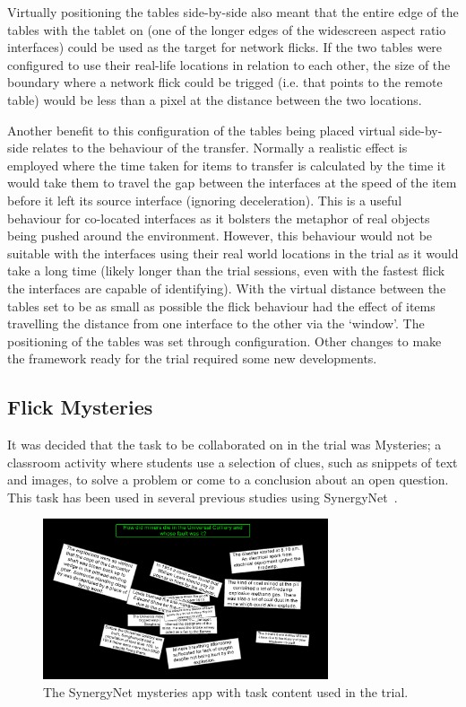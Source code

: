 \documentclass[a4paper,11pt]{article}
\begin{document}
Virtually positioning the tables side-by-side also meant that the entire edge of the tables with the tablet on (one of the longer edges of the widescreen aspect ratio interfaces) could be used as the target for network flicks.
If the two tables were configured to use their real-life locations in relation to each other, the size of the boundary where a network flick could be trigged (i.e. that points to the remote table) would be less than a pixel at the distance between the two locations.

Another benefit to this configuration of the tables being placed virtual side-by-side relates to the behaviour of the transfer.
Normally a realistic effect is employed where the time taken for items to transfer is calculated by the time it would take them to travel the gap between the interfaces at the speed of the item before it left its source interface (ignoring deceleration).
This is a useful behaviour for co-located interfaces as it bolsters the metaphor of real objects being pushed around the environment.
However, this behaviour would not be suitable with the interfaces using their real world locations in the trial as it would take a long time (likely longer than the trial sessions, even with the fastest flick the interfaces are capable of identifying).
With the virtual distance between the tables set to be as small as possible the flick behaviour had the effect of items travelling the distance from one interface to the other via the `window'.
The positioning of the tables was set through configuration.
Other changes to make the framework ready for the trial required some new developments.

\subsection{Flick Mysteries}

It was decided that the task to be collaborated on in the trial was Mysteries; a classroom activity where students use a selection of clues, such as snippets of text and images, to solve a problem or come to a conclusion about an open question.
This task has been used in several previous studies using SynergyNet~\cite{mercier:2013,mercier:2014,mercier:2015}.

\begin{figure}[h]
 \centering
   \includegraphics[width=0.75\textwidth]{figures/flickmysteryexample.png}
   \caption{The SynergyNet mysteries app with task content used in the trial.}
   \label{fig:FlickMysteryExample}
\end{figure}
\end{document}
